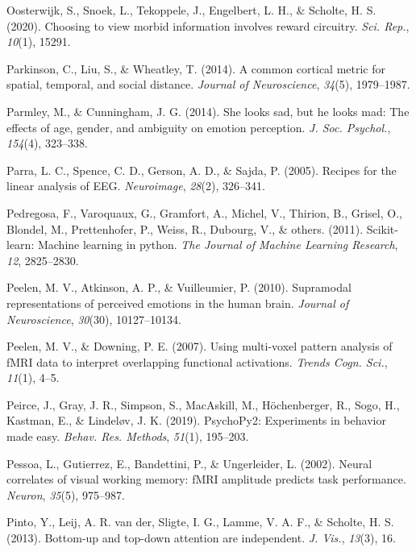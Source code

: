 \documentclass[11pt,american,a4paper,oneside,]{memoir} %
\begin{document}
\leavevmode\hypertarget{ref-Oosterwijk2020-uf}{}%
Oosterwijk, S., Snoek, L., Tekoppele, J., Engelbert, L. H., \& Scholte, H. S. (2020). Choosing to view morbid information involves reward circuitry. \emph{Sci. Rep.}, \emph{10}(1), 15291.

\leavevmode\hypertarget{ref-parkinson2014common}{}%
Parkinson, C., Liu, S., \& Wheatley, T. (2014). A common cortical metric for spatial, temporal, and social distance. \emph{Journal of Neuroscience}, \emph{34}(5), 1979--1987.

\leavevmode\hypertarget{ref-Parmley2014-nj}{}%
Parmley, M., \& Cunningham, J. G. (2014). She looks sad, but he looks mad: The effects of age, gender, and ambiguity on emotion perception. \emph{J. Soc. Psychol.}, \emph{154}(4), 323--338.

\leavevmode\hypertarget{ref-Parra2005-um}{}%
Parra, L. C., Spence, C. D., Gerson, A. D., \& Sajda, P. (2005). Recipes for the linear analysis of EEG. \emph{Neuroimage}, \emph{28}(2), 326--341.

\leavevmode\hypertarget{ref-pedregosa2011scikit}{}%
Pedregosa, F., Varoquaux, G., Gramfort, A., Michel, V., Thirion, B., Grisel, O., Blondel, M., Prettenhofer, P., Weiss, R., Dubourg, V., \& others. (2011). Scikit-learn: Machine learning in python. \emph{The Journal of Machine Learning Research}, \emph{12}, 2825--2830.

\leavevmode\hypertarget{ref-peelen2010supramodal}{}%
Peelen, M. V., Atkinson, A. P., \& Vuilleumier, P. (2010). Supramodal representations of perceived emotions in the human brain. \emph{Journal of Neuroscience}, \emph{30}(30), 10127--10134.

\leavevmode\hypertarget{ref-Peelen2007-ew}{}%
Peelen, M. V., \& Downing, P. E. (2007). Using multi-voxel pattern analysis of fMRI data to interpret overlapping functional activations. \emph{Trends Cogn. Sci.}, \emph{11}(1), 4--5.

\leavevmode\hypertarget{ref-Peirce2019-rj}{}%
Peirce, J., Gray, J. R., Simpson, S., MacAskill, M., Höchenberger, R., Sogo, H., Kastman, E., \& Lindeløv, J. K. (2019). PsychoPy2: Experiments in behavior made easy. \emph{Behav. Res. Methods}, \emph{51}(1), 195--203.

\leavevmode\hypertarget{ref-Pessoa2002-tb}{}%
Pessoa, L., Gutierrez, E., Bandettini, P., \& Ungerleider, L. (2002). Neural correlates of visual working memory: fMRI amplitude predicts task performance. \emph{Neuron}, \emph{35}(5), 975--987.

\leavevmode\hypertarget{ref-Pinto2013-kh}{}%
Pinto, Y., Leij, A. R. van der, Sligte, I. G., Lamme, V. A. F., \& Scholte, H. S. (2013). Bottom-up and top-down attention are independent. \emph{J. Vis.}, \emph{13}(3), 16.
\end{document}
